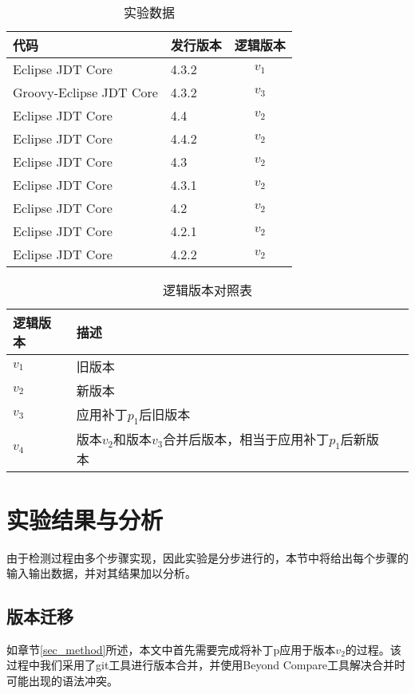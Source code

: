 \begin{table}
	\caption{实验数据}
	\label{exp_data}
	\centering
	\begin{tabular}{llc}
		\toprule[1.5pt]
		{\heiti 代码} & {\heiti 发行版本} & {\heiti 逻辑版本} \\\midrule[1pt]
		Eclipse JDT Core & 4.3.2 & $v_1$ \\
		Groovy-Eclipse JDT Core & 4.3.2 & $v_3$\\
		Eclipse JDT Core & 4.4 & $v_2$\\
		Eclipse JDT Core & 4.4.2 & $v_2$\\
		Eclipse JDT Core & 4.3 & $v_2$\\
		Eclipse JDT Core & 4.3.1 & $v_2$\\
		Eclipse JDT Core & 4.2 & $v_2$\\
		Eclipse JDT Core & 4.2.1 & $v_2$\\
		Eclipse JDT Core & 4.2.2 & $v_2$\\
		\bottomrule[1.5pt]
	\end{tabular}
\end{table}

\begin{table}
	\caption{逻辑版本对照表}
	\label{exp_version}
	\centering
	\begin{tabular}{llc}
		\toprule[1.5pt]
		{\heiti 逻辑版本} & {\heiti 描述} \\\midrule[1pt]
		$v_1$ & 旧版本 \\
		$v_2$ & 新版本\\
		$v_3$ & 应用补丁$p_1$后旧版本\\
		$v_4$ & 版本$v_2$和版本$v_3$合并后版本，相当于应用补丁$p_1$后新版本\\
		\bottomrule[1.5pt]
	\end{tabular}
\end{table}

\section{实验结果与分析}
\label {exp_result}

由于检测过程由多个步骤实现，因此实验是分步进行的，本节中将给出每个步骤的输入输出数据，并对其结果加以分析。

\subsection{版本迁移}

如章节\ref {sec_method}所述，本文中首先需要完成将补丁p应用于版本$v_2$的过程。该过程中我们采用了git工具进行版本合并，并使用Beyond Compare工具解决合并时可能出现的语法冲突。

